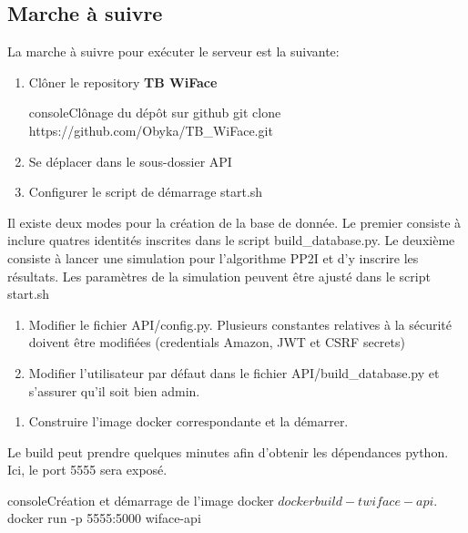 \subsection{Marche à suivre}
La marche à suivre pour exécuter le serveur est la suivante:
\begin{enumerate}
    \item Clôner le repository \textbf{TB WiFace}
    \begin{listingsbox}{console}{Clônage du dépôt sur github}
git clone https://github.com/Obyka/TB_WiFace.git
    \end{listingsbox}
    \item{Se déplacer dans le sous-dossier API}
    \item{Configurer le script de démarrage start.sh}
\end{enumerate}
    Il existe deux modes pour la création de la base de donnée. Le premier
    consiste à inclure quatres identités inscrites dans le script build\_database.py.
    Le deuxième consiste à lancer une simulation pour l'algorithme PP2I et d'y inscrire les résultats.
    Les paramètres de la simulation peuvent être ajusté dans le script start.sh
    
    
\begin{enumerate}[resume]
    \item Modifier le fichier API/config.py. Plusieurs constantes relatives à la sécurité doivent être modifiées (credentials Amazon, JWT et CSRF secrets)
    \item Modifier l'utilisateur par défaut dans le fichier API/build\_database.py et s'assurer qu'il soit bien admin.
\end{enumerate}

\begin{enumerate}[resume]
    \item Construire l'image docker correspondante et la démarrer.
\end{enumerate}

Le build peut prendre quelques minutes afin d'obtenir les dépendances python.
Ici, le port 5555 sera exposé.
\begin{listingsbox}{console}{Création et démarrage de l'image docker}
$ docker build -t wiface-api .
$ docker run -p 5555:5000 wiface-api
\end{listingsbox}

